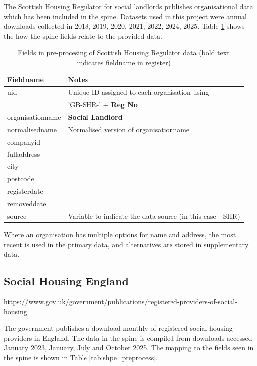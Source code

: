 \documentclass{article}
\begin{document}
The Scottish Housing Regulator for social landlords publishes organisational data which has been included in the spine.
Datasets used in this project were annual downloads collected in 2018, 2019, 2020, 2021, 2022, 2024, 2025. 
Table \ref{tab:shr_preprocess} shows the how the spine fields relate to the provided data.

\begin{table}[h]
  \centering
  \begin{tabularx}{\textwidth}{|l|X|}
    \hline
    Fieldname  &	Notes \\
    \hline \hline
uid & Unique ID assigned to each organisation using \\
&'GB-SHR-' + \textbf{Reg No}\\ \hline
organisationname & \textbf{Social Landlord} \\ \hline
normalisedname & Normalised version of organisationname\\ \hline
companyid &  \\ \hline
fulladdress &  \\ \hline
city & \\ \hline
postcode & \\ \hline
registerdate & \\ \hline
removeddate & \\ \hline
source & Variable to indicate the data source (in this case - SHR) \\ \hline
\hline 
\end{tabularx}
  \caption{Fields in pre-procesing of Scottish Housing Regulator data (bold text indicates fieldname in register)}
  \label{tab:shr_preprocess}
  
\end{table}

Where an organisation has multiple options for name and address, the most recent
is used in the primary data, and alternatives are stored in supplementary data.



\clearpage
\subsection{Social Housing England 	}
\url{https://www.gov.uk/government/publications/registered-providers-of-social-housing}

The government publishes a download monthly of registered social housing providers in England. The data in the 
spine is compiled from downloads accessed January 2023, January, July and October 2025. The mapping to the fields
seen in the spine is shown in Table \ref{tab:shpe_preprocess}.
\end{document}
